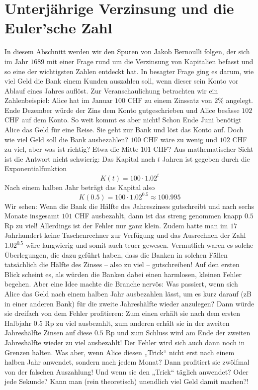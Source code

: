 \documentclass[11pt,oneside]{article}
\begin{document}
\section{Unterjährige Verzinsung und die Euler'sche Zahl}
	In diesem Abschnitt werden wir den Spuren von Jakob Bernoulli folgen, der sich im Jahr $1689$ mit einer Frage rund um die Verzinsung von Kapitalien befasst und so eine der wichtigsten Zahlen entdeckt hat.\vspace{16pt}\newline
	In besagter Frage ging es darum, wie viel Geld die Bank einem Kunden auszahlen soll, wenn dieser sein Konto vor Ablauf eines Jahres auflöst. Zur Veranschaulichung betrachten wir ein Zahlenbeispiel:\newline
	Alice hat im Januar $100$ CHF zu einem Zinssatz von $2\%$ angelegt. Ende Dezember würde der Zins dem Konto gutgeschrieben und Alice besässe $102$ CHF auf dem Konto. So weit kommt es aber nicht! Schon Ende Juni benötigt Alice das Geld für eine Reise. Sie geht zur Bank und löst das Konto auf. Doch wie viel Geld soll die Bank ausbezahlen? $100$ CHF wäre zu wenig und $102$ CHF zu viel, aber was ist richtig? Etwa die Mitte $101$ CHF?\vspace{16pt}\newline
	Aus mathematischer Sicht ist die Antwort nicht schwierig: Das Kapital nach $t$ Jahren ist gegeben durch die Exponentialfunktion
	\[K(t)=100\cdot 1.02^t\]
	Nach einem halben Jahr beträgt das Kapital also
	\[K(0.5)=100\cdot 1.02^{0.5}\approx100.995\]
	Wir sehen: Wenn die Bank die Hälfte des Jahreszinses gutschreibt und nach sechs Monate insgesamt $101$ CHF ausbezahlt, dann ist das streng genommen knapp $0.5$ Rp zu viel! Allerdings ist der Fehler nur ganz klein. Zudem hatte man im $17$ Jahrhundert keine Taschenrechner zur Verfügung und das Ausrechnen der Zahl $1.02^{0.5}$ wäre langwierig und somit auch teuer gewesen. Vermutlich waren es solche Überlegungen, die dazu geführt haben, dass die Banken in solchen Fällen tatsächlich die Hälfte des Zinses – also zu viel – gutschreiben!\vspace{16pt}\newline
	Auf den ersten Blick scheint es, als würden die Banken dabei einen harmlosen, kleinen Fehler begehen. Aber eine Idee machte die Branche nervös: Was passiert, wenn sich Alice das Geld nach einem halben Jahr ausbezahlen lässt, um es kurz darauf (zB in einer anderen Bank) für die zweite Jahreshälfte wieder anzulegen? Dann würde sie dreifach von dem Fehler profitieren: Zum einen erhält sie nach dem ersten Halbjahr $0.5$ Rp zu viel ausbezahlt, zum anderen erhält sie in der zweiten Jahreshälfte Zinsen auf diese $0.5$ Rp und zum Schluss wird am Ende der zweiten Jahreshälfte wieder zu viel ausbezahlt! Der Fehler wird sich auch dann noch in Grenzen halten. Was aber, wenn Alice diesen „Trick“ nicht erst nach einem halben Jahr anwendet, sondern nach jedem Monat? Dann profitiert sie zwölfmal von der falschen Auszahlung! Und wenn sie den „Trick“ täglich anwendet? Oder jede Sekunde? Kann man (rein theoretisch) unendlich viel Geld damit machen?!\vspace{16pt}\newline
\end{document}

